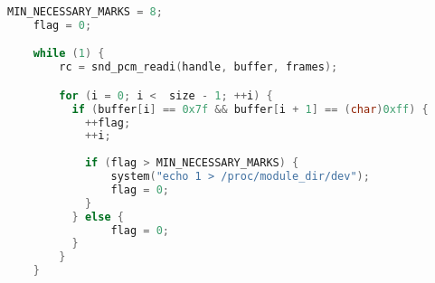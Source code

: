 \begin{lstlisting}[language=C, caption={Обнаружение нажатия},label=PrepareCapture]
	MIN_NECESSARY_MARKS = 8;
	flag = 0;

	while (1) {
    	rc = snd_pcm_readi(handle, buffer, frames);

    	for (i = 0; i <  size - 1; ++i) {
    	  if (buffer[i] == 0x7f && buffer[i + 1] == (char)0xff) {
    	    ++flag;
    	    ++i;
    	    
    	    if (flag > MIN_NECESSARY_MARKS) {
    	        system("echo 1 > /proc/module_dir/dev");
    	        flag = 0;
    	    }
    	  } else {
    	        flag = 0;
    	  }
    	}
    }

\end{lstlisting}
